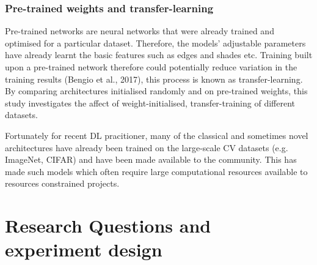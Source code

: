 \documentclass[11pt, a4paper, twoside]{report}
\begin{document}
\begin{table}[H]
  \centering
  \label{table:data_count}
  \caption{Resulted image and label pair for each dataset input configuration}
\end{table}

\subsubsection{Pre-trained weights and transfer-learning}\label{pretrained_weights}

Pre-trained networks are neural networks that were already trained and optimised for a particular dataset. Therefore, the models' adjustable parameters have already learnt the basic features such as edges and shades etc. Training built upon a pre-trained network therefore could potentially reduce variation in the training results (Bengio et al., 2017), this process is known as transfer-learning. By comparing architectures initialised randomly and on pre-trained weights, this study investigates the affect of weight-initialised, transfer-training of different datasets.\\\par

Fortunately for recent DL pracitioner, many of the classical and sometimes novel architectures have already been trained on the large-scale CV datasets (e.g. ImageNet, CIFAR) and have been made available to the community. This has made such models which often require large computational resources available to resources constrained projects.\\\par

\section{Research Questions and experiment design}\label{RQ}
\end{document}

